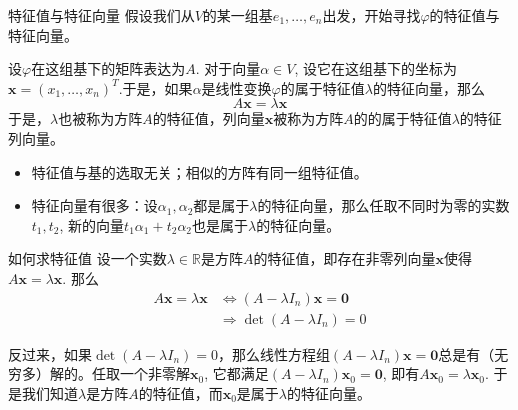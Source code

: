 
\begin{frame}

\begin{block}{特征值与特征向量}
假设我们从$V$的某一组基$e_1, \ldots, e_n$出发，开始寻找$\varphi$的特征值与特征向量。

\vspace{1em}
\pause

设$\varphi$在这组基下的矩阵表达为$A$. 对于向量$\alpha \in V$, 设它在这组基下的坐标为$\mathbf{x} = (x_1,\ldots,x_n)^T$.于是，如果$\alpha$是线性变换$\varphi$的属于特征值$\lambda$的特征向量，那么
\[A\mathbf{x} = \lambda\mathbf{x}\]
于是，$\lambda$也被称为方阵$A$的特征值，列向量$\mathbf{x}$被称为方阵$A$的的属于特征值$\lambda$的特征列向量。


\vspace{1em}
\pause
\begin{itemize}
\item 特征值与基的选取无关；相似的方阵有同一组特征值。
\item 特征向量有很多：设$\alpha_1,\alpha_2$都是属于$\lambda$的特征向量，那么任取不同时为零的实数$t_1,t_2$, 新的向量$t_1\alpha_1+t_2\alpha_2$也是属于$\lambda$的特征向量。
\end{itemize}
\end{block}

\end{frame}


\begin{frame}

\begin{block}{如何求特征值}
设一个实数$\lambda\in\mathbb{R}$是方阵$A$的特征值，即存在非零列向量$\mathbf{x}$使得$A\mathbf{x} = \lambda\mathbf{x}$. 那么
\begin{align*}
A\mathbf{x} = \lambda\mathbf{x} & \Longleftrightarrow (A - \lambda I_n) \mathbf{x} = \mathbf{0} \\
& \Longrightarrow \det (A - \lambda I_n) = 0
\end{align*}

\pause

反过来，如果$\det (A - \lambda I_n) = 0$，那么线性方程组$(A - \lambda I_n) \mathbf{x} = \mathbf{0}$总是有（无穷多）解的。任取一个非零解$\mathbf{x}_0$, 它都满足$(A - \lambda I_n) \mathbf{x}_0 = \mathbf{0}$, 即有$A\mathbf{x}_0 = \lambda\mathbf{x}_0$. 于是我们知道$\lambda$是方阵$A$的特征值，而$\mathbf{x}_0$是属于$\lambda$的特征向量。
\end{block}

\end{frame}

